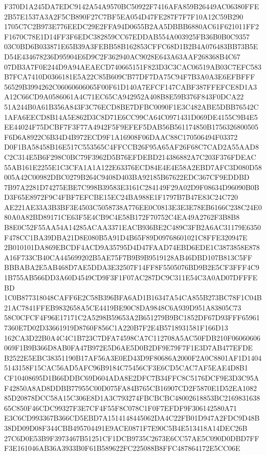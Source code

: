 \documentclass[UTF8,fontset=fandol,zihao=-4,a4paper]{ctexart}
\begin{document}
{{F370D1A245DA7EDC9142A54A9570BC50922F7416AFA859B26449AC06380FFE2B57E1537A3A2F5CB890F27C7BF5EA054D47FE287F7F7F10A12C59B290
1705C7C2B973E776EEDC29E2FFA94D0655B2AA5DBBB6880AC61F621011FF2F1670C78E1D14FF3F6EDC382859CC67EDDAB554A003925FB36B0B0C9357
03C0BD6B033871E65B39A3FEBB58B162853CFFC68D1B2B4A076483BB73B5ED54E434678236D95904E6D9C2F362940AC9028E643A63AAF268368B4C67
07DB3A7F0E244D9A94AEAECD740665151F823D3C3CAC06519AB03C7EFC583B7FCA7410D0366181E5A22C85B609CB77DF7DA75C94F7B3A0A3E6EFBFFF
56529B3994262C06060606065F00F61D140A7EFCF147CABF387FFEFCE8D1A3A12C66CD9A0586061A4C71EC65CA942952A408B8E59B376F843F0DCA22
51A244B0A61B356A843F3C76ECD8BE7DFBC0090F1E3C482ABE5DBB76542C1AFA6EECD8B14A5E862D3C8D71E6CC99CA64C0971431D069DE4155C9B4E5
EE44024F75DCBF7F3F77A4942F5F9EFEF5DAB56B561174850B1756326800505F6D6A8922C6B34D4B972ECD9F1A16908F06DAAC88C170506494F03372
D0F1BA58458B16E517C553565C4FFCCB26F95A65AF26F68C7CAD2A55AAD8C2C314E5B6F298C0BC79F3962D5B76EFDEBD214386882A7C203F376FDEAC
55AB161E2255E1C3CFA1A1A122E63376ECD84E4E4E58A2EBD7AFC3D080D58005A42C00982DBC0279B264C9408D403BA92185B67622EDC367CF9EDDBD
7B97A2281D74275EBE7C998B39583E3161C284149F29A02D9F08634D96090B0BD3F65E8972F9C4FBF7EFCBE15EC24BA988E1F1797B7B47E83C24C720
AE221AE33A3B3BF3E4503C5058738A776EE0C0813E3E3E78EB6166C238C24E080A0A82BD89171CE63F5E4CB9C4E58B172F70752C4EA49A2762F3B8B8
B8E0C52F55AA54A14285ACAA3371EACB936BE2C489C3FB2A6AC31179E6350F478CC1BA39DBA21D8E080B5A91D4B65F89D09768601021C8FFE320947E
2B010101DA869EBCDF4ACD9A35795D4D47FAAD74EBD6EDE1C3873858E878A16F733CB40CA445699202B5AE75F7B9B9B9519128AB46DBD107B813C5FF
BBBABA2E5AB468D7AE5DDA3E32507F14FF8F5505076BD9B2E5CF3FFF4C91B755AB566DD3A60D4549CD9F3F1F07AC287DC9C311E54C3A0AD07DFFFEBD
1C0B877318048CAFF6E2C58B396BFA6AD1B16347A54CA855B273BC78F1C04B21AC7841FFEB9832658A5CE4419BE90C8DA9848C6A939D951A83805C73
58C0CFCF4F96E17171C2A5298B59653A2B651279B9BC1852DF67D93FFF659617360E7D02D33661919D8760F856C1A220B7F2E4B5718931581F166D13
162CA3D22B0A4C4C1B723C7DFA74598CA7C112708A5AC50FDB210F06060606069F1B9B366D8AB0FA47B972E5D6AE5D0B2DF9E79F7F1E3D7AB477EFDE
B2522E5EBC38351190B17AF56A3E0ED43D9F80686A2000F2A0C8801AF1D14045143158F15CAC56AD5AFC96B9184C75456CF3E6CD5CAC7AF5EAE4D8B1
CF10408695D1B66DDBC69D604ADA8E2DFC7B34FFC8C5176DCF9E3D3C95AF42850A8AD8DDBB77955C00D075FA84B765CB16907CD2F5870E1D52EA1082
85D20878DCC58A15C306E8D1A3C793274FBCBCBC48002618853BC216983163865C850F46CDC99327F3E7CF4F55F8C078C1F0F7EFDF9F306142580A71
E3C6CD993367B366CD5EBD7A1514148445062DA4C22FB01D947A2FDC9D48B38DD09D08F344CBB495704491E9ACE0871F7E90C5B4E513418A14DEC26B
27C6D0E53B9F3973467B51251CF1DCB9735C2673E6CC57AE5C090D0DBD7FFF3E161046AB36A3933B0F61B589622FC225088B8FFC487864172E5CC06E
}}
\end{document}
